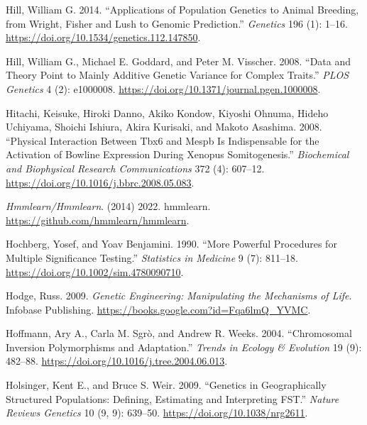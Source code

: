 \documentclass[
]{book}
\newlength{\cslhangindent}
\newlength{\cslentryspacingunit} %
\newenvironment{CSLReferences}[2] %
 {%
  \setlength{\parindent}{0pt}
  \ifodd #1
  \let\oldpar\par
  \def\par{\hangindent=\cslhangindent\oldpar}
  \fi
  \setlength{\parskip}{#2\cslentryspacingunit}
 }%
 {}
\begin{document}
\begin{CSLReferences}{1}{0}
\leavevmode{}%
Hill, William G. 2014. {``Applications of {Population Genetics} to {Animal Breeding}, from {Wright}, {Fisher} and {Lush} to {Genomic Prediction}.''} \emph{Genetics} 196 (1): 1--16. \url{https://doi.org/10.1534/genetics.112.147850}.

\leavevmode{}%
Hill, William G., Michael E. Goddard, and Peter M. Visscher. 2008. {``Data and {Theory Point} to {Mainly Additive Genetic Variance} for {Complex Traits}.''} \emph{PLOS Genetics} 4 (2): e1000008. \url{https://doi.org/10.1371/journal.pgen.1000008}.

\leavevmode{}%
Hitachi, Keisuke, Hiroki Danno, Akiko Kondow, Kiyoshi Ohnuma, Hideho Uchiyama, Shoichi Ishiura, Akira Kurisaki, and Makoto Asashima. 2008. {``Physical Interaction Between {Tbx6} and Mespb Is Indispensable for the Activation of Bowline Expression During {Xenopus} Somitogenesis.''} \emph{Biochemical and Biophysical Research Communications} 372 (4): 607--12. \url{https://doi.org/10.1016/j.bbrc.2008.05.083}.

\leavevmode{}%
\emph{Hmmlearn/Hmmlearn}. (2014) 2022. {hmmlearn}. \url{https://github.com/hmmlearn/hmmlearn}.

\leavevmode{}%
Hochberg, Yosef, and Yoav Benjamini. 1990. {``More Powerful Procedures for Multiple Significance Testing.''} \emph{Statistics in Medicine} 9 (7): 811--18. \url{https://doi.org/10.1002/sim.4780090710}.

\leavevmode{}%
Hodge, Russ. 2009. \emph{Genetic {Engineering}: {Manipulating} the {Mechanisms} of {Life}}. {Infobase Publishing}. \url{https://books.google.com?id=Fqa6lmQ_YVMC}.

\leavevmode{}%
Hoffmann, Ary A., Carla M. Sgrò, and Andrew R. Weeks. 2004. {``Chromosomal Inversion Polymorphisms and Adaptation.''} \emph{Trends in Ecology \& Evolution} 19 (9): 482--88. \url{https://doi.org/10.1016/j.tree.2004.06.013}.

\leavevmode{}%
Holsinger, Kent E., and Bruce S. Weir. 2009. {``Genetics in Geographically Structured Populations: Defining, Estimating and Interpreting {FST}.''} \emph{Nature Reviews Genetics} 10 (9, 9): 639--50. \url{https://doi.org/10.1038/nrg2611}.


\end{CSLReferences}
\end{document}
